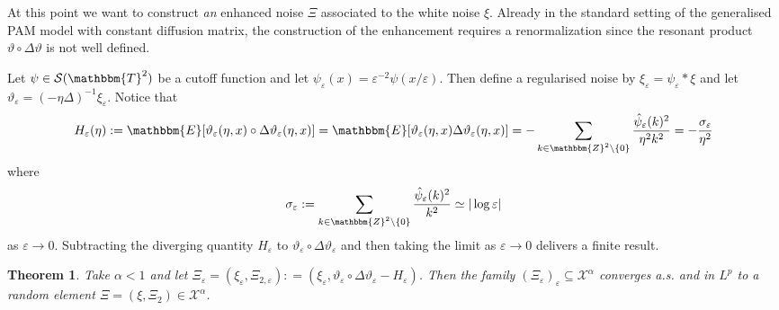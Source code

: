 \documentclass[11pt,reqno]{amsart}
\newcommand{\assign}{:=}
\newcommand{\tmtextit}[1]{{\itshape{#1}}}
\newtheorem{theorem}{Theorem}
\begin{document}
At this point we want to construct \tmtextit{an} enhanced noise $\Xi$
associated to the white noise $\xi$. Already in the standard setting of the
generalised PAM model with constant diffusion matrix, the construction of the
enhancement requires a renormalization since the resonant product $\vartheta
\circ \Delta \vartheta$ is not well defined.

Let $\psi \in \mathcal{S} (\mathbbm{T}^2)$ be a cutoff function and let
$\psi_{\varepsilon} (x) = \varepsilon^{- 2} \psi (x / \varepsilon)$. Then
define a regularised noise by $\xi_{\varepsilon} = \psi_{\varepsilon} \ast
\xi$ and let $\vartheta_{\varepsilon} = (- \eta \Delta)^{- 1}
\xi_{\varepsilon}$. Notice that
\[ H_{\varepsilon} (\eta) \assign \mathbbm{E} [\vartheta_{\varepsilon} (\eta,
   x) \circ \Delta \vartheta_{\varepsilon} (\eta, x)] =\mathbbm{E}
   [\vartheta_{\varepsilon} (\eta, x) \Delta \vartheta_{\varepsilon} (\eta,
   x)] = - \sum_{k \in \mathbbm{Z}^2 \backslash \{ 0 \}}
   \frac{\hat{\psi}_{\varepsilon} (k)^2}{\eta^2 k^2} = -
   \frac{\sigma_{\varepsilon}}{\eta^2} \]
where
\[ \sigma_{\varepsilon} \assign \sum_{k \in \mathbbm{Z}^2 \backslash \{ 0 \}}
   \frac{\hat{\psi}_{\varepsilon} (k)^2}{k^2} \simeq | \log \varepsilon | \]
as $\varepsilon \rightarrow 0$. Subtracting the diverging quantity
$H_{\varepsilon}$ to $\vartheta_{\varepsilon} \circ \Delta
\vartheta_{\varepsilon}$ and then taking the limit as $\varepsilon \rightarrow
0$ delivers a finite result.

\begin{theorem}
  \label{th:conv-white-noise}Take $\alpha < 1$ and let $\Xi_{\varepsilon} =
  (\xi_{\varepsilon}, \Xi_{2, \varepsilon}) : = (\xi_{\varepsilon},
  \vartheta_{\varepsilon} \circ \Delta \vartheta_{\varepsilon} -
  H_{\varepsilon})$. Then the family $(\Xi_{\varepsilon})_{\varepsilon}
  \subseteq \mathcal{X}^{\alpha}$ converges a.s. and in $L^p$ to a random
  element $\Xi = (\xi, \Xi_2) \in \mathcal{X}^{\alpha}$.
\end{theorem}
\end{document}
